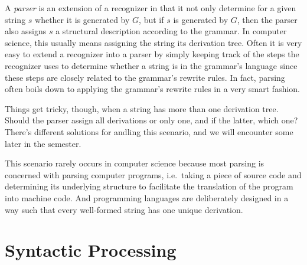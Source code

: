A \emph{parser} is an extension of a recognizer in that it not only determine for a given string $s$ whether it is generated by $G$, but if $s$ is generated by $G$, then the parser also assigns $s$ a structural description according to the grammar.
In computer science, this usually means assigning the string its derivation tree.
Often it is very easy to extend a recognizer into a parser by simply keeping track of the steps the recognizer uses to determine whether a string is in the grammar's language since these steps are closely related to the grammar's rewrite rules.
In fact, parsing often boils down to applying the grammar's rewrite rules in a very smart fashion.

Things get tricky, though, when a string has more than one derivation tree.
Should the parser assign all derivations or only one, and if the latter, which one?
There's different solutions for andling this scenario, and we will encounter some later in the semester.

\begin{remark}
    This scenario rarely occurs in computer science because most parsing is concerned with parsing computer programs, i.e.\ taking a piece of source code and determining its underlying structure to facilitate the translation of the program into machine code.
    And programming languages are deliberately designed in a way such that every well-formed string has one unique derivation.
\end{remark}


\section{Syntactic Processing}
\label{sec:BigPicture_Processing}
